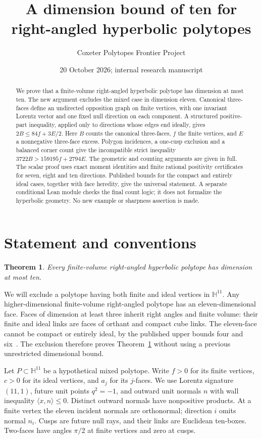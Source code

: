 \documentclass[11pt]{article}
\title{A dimension bound of ten for right-angled hyperbolic polytopes}
\author{Coxeter Polytopes Frontier Project}
\date{20 October 2026; internal research manuscript}
\newtheorem{theorem}{Theorem}[section]
\newcommand{\HH}{\mathbb H}
\newcommand{\ip}[2]{\langle #1,#2\rangle}
\begin{document}
\maketitle
\begin{abstract}
We prove that a finite-volume right-angled hyperbolic polytope has
dimension at most ten. The new argument excludes the mixed case in
dimension eleven. Canonical three-faces define an undirected opposition
graph on finite vertices, with one invariant Lorentz vector and one
fixed null direction on each component. A structured positive-part
inequality, applied only to directions whose edges end ideally, gives
$2B\le84f+3E/2$. Here $B$ counts the canonical three-faces, $f$ the
finite vertices, and $E$ a nonnegative three-face excess. Polygon
incidences, a one-cusp exclusion and a balanced corner count give the
incompatible strict inequality $3722B>159195f+2794E$.
The geometric and counting arguments are given in full. The scalar
proof uses exact moment identities and finite rational positivity
certificates for seven, eight and ten directions. Published bounds for the compact
and entirely ideal cases, together with face heredity, give the
universal statement. A separate conditional Lean module checks the
final count logic; it does not formalize the hyperbolic geometry.
No new example or sharpness assertion is made.
\end{abstract}

\section{Statement and conventions}
\begin{theorem}\label{thm:main}
Every finite-volume right-angled hyperbolic polytope has dimension
at most ten.
\end{theorem}
We will exclude a polytope having both finite and ideal vertices in
$\HH^{11}$. Any higher-dimensional finite-volume right-angled polytope
has an eleven-dimensional face. Faces of dimension at least three inherit
right angles and finite volume: their finite and ideal links are faces of orthant and compact
cube links. The eleven-face cannot be compact or entirely ideal,
by the published upper bounds four and six~\cite{PV,Kolpakov}.
The exclusion therefore proves Theorem~\ref{thm:main} without using a
previous unrestricted dimensional bound.

Let $P\subset\HH^{11}$ be a hypothetical mixed polytope. Write $f>0$
for its finite vertices, $c>0$ for its ideal vertices, and $a_j$ for
its $j$-faces. We use Lorentz signature $(11,1)$, future unit points
$q^2=-1$, and outward unit normals $n$ with wall inequality
$\ip{x}{n}\le0$. Distinct outward normals have nonpositive products.
At a finite vertex the eleven incident normals are orthonormal;
direction $i$ omits normal $n_i$. Cusps are future null rays, and
their links are Euclidean ten-boxes. Two-faces have angles $\pi/2$
at finite vertices and zero at cusps.
\end{document}
